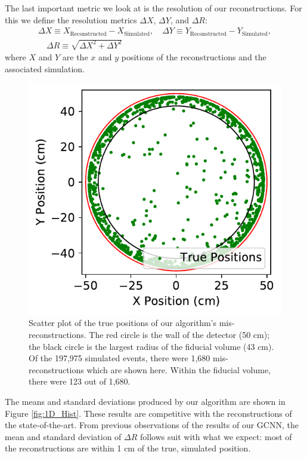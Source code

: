 \documentclass[../thesis.tex]{subfiles}
\begin{document}
\par The last important metric we look at is the resolution of our reconstructions.
For this we define the resolution metrics $\Delta X$, $\Delta Y$, and $\Delta R$:
\begin{gather*}
	\Delta X \equiv X_\text{Reconstructed} - X_\text{Simulated},
	\quad \Delta Y \equiv Y_\text{Reconstructed} - Y_\text{Simulated}, \\
	\quad \Delta R \equiv \sqrt{ \Delta X^2 + \Delta Y^2 }
\end{gather*}
where $X$ and $Y$ are the $x$ and $y$ positions of the reconstructions and the associated simulation.
\begin{figure}
	\centering
	\includegraphics[width=\linewidth]{figures/gcnn_Delaunay-Prenoise_1cm-err.pdf}
	\caption{
	Scatter plot of the true positions of our algorithm's mis-reconstructions.
	The red circle is the wall of the detector (50 cm); the black circle is the largest radius of the fiducial volume (43 cm).
	Of the 197,975 simulated events, there were 1,680 mis-reconstructions which are shown here.
	Within the fiducial volume, there were 123 out of 1,680.
	}
	\label{fig:1cm_Counts}
\end{figure}
The means and standard deviations produced by our algorithm are shown in Figure \ref{fig:1D_Hist}.
These results are competitive with the reconstructions of the state-of-the-art.
From previous observations of the results of our GCNN, the mean and standard deviation of $\Delta R$ follows suit with what we expect: most of the reconstructions are within 1 cm of the true, simulated position.
\end{document}
